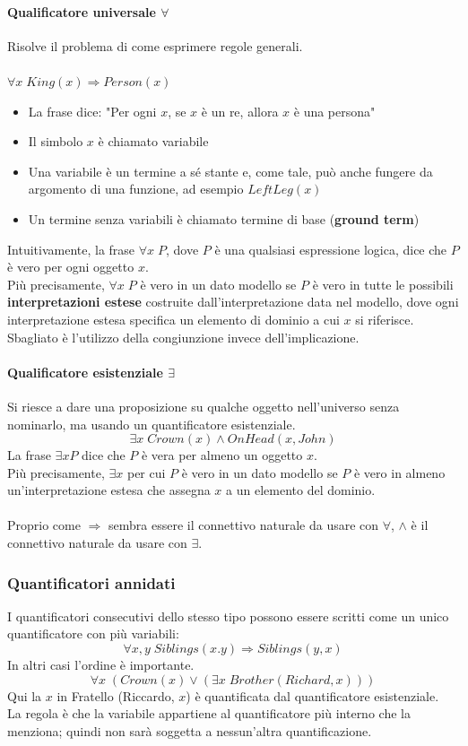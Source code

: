 \documentclass[../main.tex]{subfiles}
\begin{document}
	\paragraph{Qualificatore universale $\forall$}
	Risolve il problema di come esprimere regole generali.\\\\
	$\forall x \; King(x) \Rightarrow Person(x)$
	\begin{itemize}
		\item La frase dice: "Per ogni $x$, se $x$ è un re, allora $x$ è una persona"
		\item Il simbolo $x$ è chiamato variabile
		\item Una variabile è un termine a sé stante e, come tale, può anche fungere da argomento di una funzione, ad esempio $LeftLeg(x)$
		\item Un termine senza variabili è chiamato termine di base (\textbf{ground term})
	\end{itemize}
	Intuitivamente, la frase $\forall x \; P$, dove $P$ è una qualsiasi espressione logica, dice che $P$ è vero per ogni oggetto $x$.\\
	Più precisamente, $\forall x \; P$ è vero in un dato modello se $P$ è vero in tutte le possibili \textbf{interpretazioni estese} costruite dall'interpretazione data nel modello, dove ogni interpretazione estesa specifica un elemento di dominio a cui $x$ si riferisce.\\
	Sbagliato è l’utilizzo della congiunzione invece dell’implicazione.
	\paragraph{Qualificatore esistenziale $\exists$}
	Si riesce a dare una proposizione su qualche oggetto nell'universo senza nominarlo, ma usando un quantificatore esistenziale.
	\[\exists x \; Crown(x) \wedge OnHead(x,John)\]
	La frase $\exists xP$ dice che $P$ è vera per almeno un oggetto $x$.\\
	Più precisamente, $\exists x$ per cui $P$ è vero in un dato modello se $P$ è vero in almeno un'interpretazione estesa che assegna $x$ a un elemento del dominio.\\\\
	Proprio come $\Rightarrow$ sembra essere il connettivo naturale da usare con $\forall$, $\wedge$ è il connettivo naturale da usare con $\exists$.
	\subsubsection{Quantificatori annidati}
	I quantificatori consecutivi dello stesso tipo possono essere scritti come un unico quantificatore con più variabili:
	\[\forall x,y \; Siblings(x.y) \Rightarrow Siblings(y,x)\]
	In altri casi l’ordine è importante.
	\[\forall x \; (Crown(x) \vee (\exists x \; Brother(Richard,x)))\]
	Qui la $x$ in Fratello (Riccardo, $x$) è quantificata dal quantificatore esistenziale.\\
	La regola è che la variabile appartiene al quantificatore più interno che la menziona; quindi non sarà soggetta a nessun'altra quantificazione.
\end{document}

